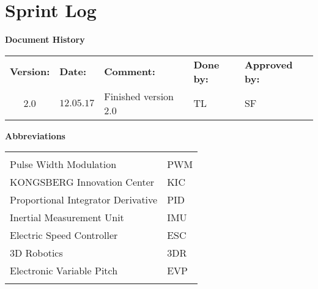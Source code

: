 \cleartoleftpage
{
\Hide
\part{Sprint Log}
}
\begin{center}
\textbf{\Large Document History}\\
\vspace*{0.2cm}
\begin{tabular}{cllll}
\rowcolor{cadetgrey}
\textbf{Version:}    &\textbf{Date:} 	 &\textbf{Comment:}    &\textbf{Done by:}   &\textbf{Approved by:}  \\
2.0       & $12.05.17$  & Finished version 2.0 & TL  & SF \\
\end{tabular}                                                                   
\end{center}

\vspace*{3.0 cm}

\begin{center}
\textbf{\Large Abbreviations}\\
\vspace*{0.2cm}
\begin{tabular}{ll}
\rowcolor{cadetgrey}
    &   \\
Pulse Width Modulation     & PWM \\\rowcolor{gainsboro}
KONGSBERG Innovation Center & KIC \\
Proportional Integrator Derivative  & PID \\\rowcolor{gainsboro}
Inertial Measurement Unit & IMU \\
Electric Speed Controller  & ESC \\\rowcolor{gainsboro}
3D Robotics & 3DR \\
Electronic Variable Pitch  & EVP \\\rowcolor{gainsboro}
\end{tabular}                                                             
\end{center}


\vspace*{2cm}
\newpage



%

